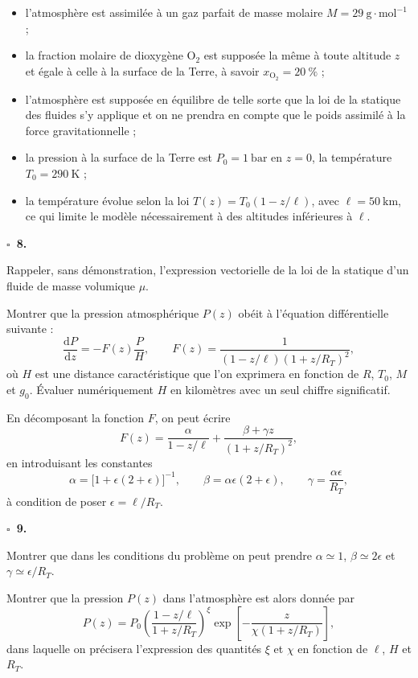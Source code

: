 \documentclass[11pt,a4paper]{article}
\newcommand{\question}[1]{%
  \par\medskip\noindent\textbf{\(\square\)\ #1.}\quad%
}
\begin{document}
\begin{itemize}
\item l'atmosphère est assimilée à un gaz parfait de masse molaire \(M=29~\mathrm{g}\cdot\mathrm{mol}^{-1}\) ;
\item la fraction molaire de dioxygène \(\mathrm{O}_2\) est supposée la même à toute altitude \(z\) et égale à celle à la surface de la Terre, à savoir \(x_{\mathrm{O}_2}=20~\%\) ;
\item l'atmosphère est supposée en équilibre de telle sorte que la loi de la statique des fluides s'y applique et on ne prendra en compte que le poids assimilé à la force gravitationnelle ;
\item la pression à la surface de la Terre est \(P_0=1~\mathrm{bar}\) en \(z=0\), la température \(T_0=290~\mathrm{K}\) ;
\item la température évolue selon la loi \(T(z)=T_0(1-z/\ell)\), avec \(\ell=50~\mathrm{km}\), ce qui limite le modèle nécessairement à des altitudes inférieures à \(\ell\).
\end{itemize}

\question{8}
Rappeler, sans démonstration, l'expression vectorielle de la loi de la statique d'un fluide de masse volumique \(\mu\).

Montrer que la pression atmosphérique \(P(z)\) obéit à l'équation différentielle suivante :
\begin{equation*}
\frac{\mathrm{d}P}{\mathrm{d}z}
= -F(z)\frac{P}{H},
\qquad
F(z)=\frac{1}{(1-z/\ell)(1+z/R_T)^2},
\end{equation*}
où \(H\) est une distance caractéristique que l'on exprimera en fonction de \(R\), \(T_0\), \(M\) et \(g_0\). Évaluer numériquement \(H\) en kilomètres avec un seul chiffre significatif.

En décomposant la fonction \(F\), on peut écrire
\begin{equation*}
F(z)=\frac{\alpha}{1-z/\ell}
+\frac{\beta+\gamma z}{(1+z/R_T)^2},
\end{equation*}
en introduisant les constantes
\[
\alpha=\bigl[1+\epsilon(2+\epsilon)\bigr]^{-1},
\qquad
\beta=\alpha\epsilon(2+\epsilon),
\qquad
\gamma=\frac{\alpha\epsilon}{R_T},
\]
à condition de poser \(\epsilon=\ell/R_T\).

\question{9}
Montrer que dans les conditions du problème on peut prendre \(\alpha\simeq 1\), \(\beta\simeq 2\epsilon\) et \(\gamma\simeq \epsilon/R_T\).

Montrer que la pression \(P(z)\) dans l'atmosphère est alors donnée par
\begin{equation}
P(z)=P_0
\left(\frac{1-z/\ell}{1+z/R_T}\right)^\xi
\exp\left[-\frac{z}{\chi(1+z/R_T)}\right],
\label{eq:pression}
\end{equation}
dans laquelle on précisera l'expression des quantités \(\xi\) et \(\chi\) en fonction de \(\ell\), \(H\) et \(R_T\).
\end{document}
